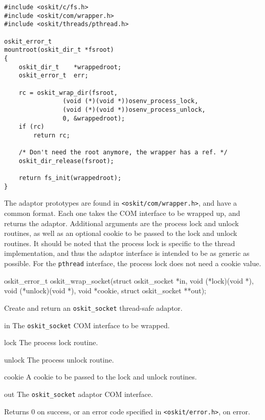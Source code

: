 \begin{codefrag}
\footnotesize
\begin{verbatim}
#include <oskit/c/fs.h>
#include <oskit/com/wrapper.h>
#include <oskit/threads/pthread.h>

oskit_error_t
mountroot(oskit_dir_t *fsroot)
{
    oskit_dir_t    *wrappedroot;
    oskit_error_t  err;

    rc = oskit_wrap_dir(fsroot,
                (void (*)(void *))osenv_process_lock, 
                (void (*)(void *))osenv_process_unlock,
                0, &wrappedroot);
    if (rc)
        return rc;

    /* Don't need the root anymore, the wrapper has a ref. */
    oskit_dir_release(fsroot);

    return fs_init(wrappedroot);
}
\end{verbatim}
\end{codefrag}

The adaptor prototypes are found in \texttt{<oskit/com/wrapper.h>}, and have a
common format. Each one takes the COM interface to be wrapped up, and
returns the adaptor. Additional arguments are the process lock and unlock
routines, as well as an optional cookie to be passed to the lock and unlock
routines. It should be noted that the process lock is specific to the
thread implementation, and thus the adaptor interface is intended to be as
generic as possible. For the {\tt pthread} interface, the process lock does
not need a cookie value.

\begin{apisyn}

	\funcproto oskit_error_t
	oskit_wrap_socket(struct oskit_socket *in, 
		void (*lock)(void *), 
		void (*unlock)(void *),
		void *cookie,
		struct oskit_socket **out);
\end{apisyn}
\begin{apidesc}
	Create and return an {\tt oskit_socket} thread-safe adaptor.
\end{apidesc}
\begin{apiparm}
	\item[in]
		The {\tt oskit_socket} COM interface to be wrapped.
	\item[lock]
		The process lock routine.
	\item[unlock]
		The process unlock routine.
	\item[cookie]
		A cookie to be passed to the lock and unlock routines.
	\item[out]
		The {\tt oskit_socket} adaptor COM interface.
\end{apiparm}
\begin{apiret}
	Returns 0 on success, or an error code specified in
	{\tt <oskit/error.h>}, on error.
\end{apiret}


